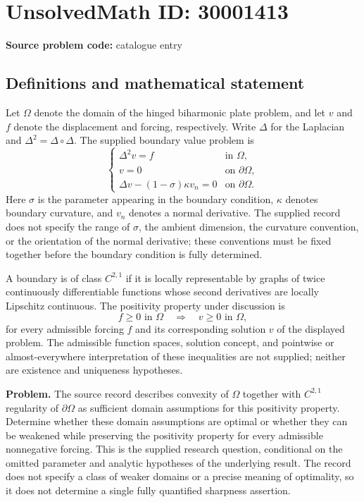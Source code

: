 \documentclass[11pt]{article}
\begin{document}
\section*{UnsolvedMath ID: 30001413}
\textbf{Source problem code:} catalogue entry
\subsection{Definitions and mathematical statement}
Let \(\Omega\) denote the domain of the hinged biharmonic plate problem, and let \(v\) and \(f\) denote the displacement and forcing, respectively. Write \(\Delta\) for the Laplacian and \(\Delta^2=\Delta\circ\Delta\). The supplied boundary value problem is
\[
\begin{cases}
\Delta^2v=f & \text{in }\Omega,\\
v=0 & \text{on }\partial\Omega,\\
\Delta v-(1-\sigma)\kappa v_n=0 & \text{on }\partial\Omega.
\end{cases}
\]
Here \(\sigma\) is the parameter appearing in the boundary condition, \(\kappa\) denotes boundary curvature, and \(v_n\) denotes a normal derivative. The supplied record does not specify the range of \(\sigma\), the ambient dimension, the curvature convention, or the orientation of the normal derivative; these conventions must be fixed together before the boundary condition is fully determined.

A boundary is of class \(C^{2,1}\) if it is locally representable by graphs of twice continuously differentiable functions whose second derivatives are locally Lipschitz continuous. The positivity property under discussion is
\[
 f\geq 0\text{ in }\Omega\quad\Longrightarrow\quad v\geq 0\text{ in }\Omega,
\]
for every admissible forcing \(f\) and its corresponding solution \(v\) of the displayed problem. The admissible function spaces, solution concept, and pointwise or almost-everywhere interpretation of these inequalities are not supplied; neither are existence and uniqueness hypotheses.

\textbf{Problem.} The source record describes convexity of \(\Omega\) together with \(C^{2,1}\) regularity of \(\partial\Omega\) as sufficient domain assumptions for this positivity property. Determine whether these domain assumptions are optimal or whether they can be weakened while preserving the positivity property for every admissible nonnegative forcing. This is the supplied research question, conditional on the omitted parameter and analytic hypotheses of the underlying result. The record does not specify a class of weaker domains or a precise meaning of optimality, so it does not determine a single fully quantified sharpness assertion.
\end{document}
